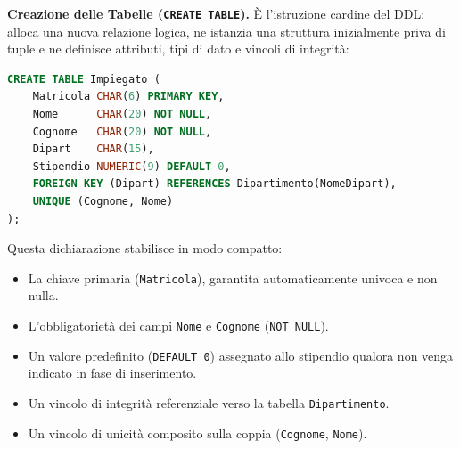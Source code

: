 \documentclass[12pt]{extarticle}
\begin{document}
\medskip
\noindent \textbf{Creazione delle Tabelle (\texttt{CREATE TABLE}).} È l'istruzione cardine del DDL: alloca una nuova relazione logica, ne istanzia una struttura inizialmente priva di tuple e ne definisce attributi, tipi di dato e vincoli di integrità:
\begin{lstlisting}[language=SQL]
CREATE TABLE Impiegato (
    Matricola CHAR(6) PRIMARY KEY,
    Nome      CHAR(20) NOT NULL,
    Cognome   CHAR(20) NOT NULL,
    Dipart    CHAR(15),
    Stipendio NUMERIC(9) DEFAULT 0,
    FOREIGN KEY (Dipart) REFERENCES Dipartimento(NomeDipart),
    UNIQUE (Cognome, Nome)
);
\end{lstlisting}
Questa dichiarazione stabilisce in modo compatto:
\begin{itemize}
    \item La chiave primaria (\texttt{Matricola}), garantita automaticamente univoca e non nulla.
    \item L'obbligatorietà dei campi \texttt{Nome} e \texttt{Cognome} (\texttt{NOT NULL}).
    \item Un valore predefinito (\texttt{DEFAULT 0}) assegnato allo stipendio qualora non venga indicato in fase di inserimento.
    \item Un vincolo di integrità referenziale verso la tabella \texttt{Dipartimento}.
    \item Un vincolo di unicità composito sulla coppia (\texttt{Cognome}, \texttt{Nome}).
\end{itemize}
\end{document}

